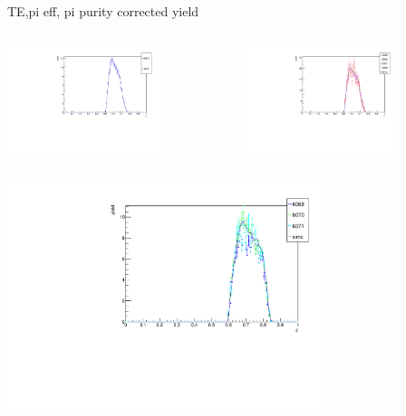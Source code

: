 \begin{frame}{TE,pi eff, pi purity corrected yield}
\begin{columns}
\begin{column}[T]{0.5\textwidth}
\includegraphics[width = 0.7\textwidth]{results/yield/check/yieldcheck_80_neg.pdf}
\end{column}
\begin{column}[T]{0.5\textwidth}
\includegraphics[width = 0.7\textwidth]{results/yield/check/yieldcheck_80_pos.pdf}
\end{column}
\end{columns}
\begin{columns}
\begin{column}[T]{0.5\textwidth}
\includegraphics[width = 0.7\textwidth]{results/yield/check/yieldcheck_70_neg.pdf}

\end{column}
\end{columns}
\end{frame}
